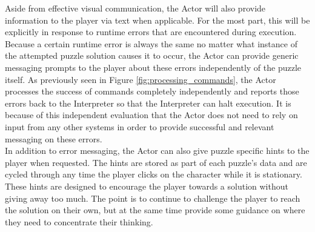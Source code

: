 Aside from effective visual communication, the Actor will also provide information to the player via text when applicable. For the most part, this will be explicitly in response to runtime errors that are encountered during execution. Because a certain runtime error is always the same no matter what instance of the attempted puzzle solution causes it to occur, the Actor can provide generic messaging prompts to the player about these errors independently of the puzzle itself. As previously seen in Figure \ref{fig:processing_commands}, the Actor processes the success of commands completely independently and reports those errors back to the Interpreter so that the Interpreter can halt execution. It is because of this independent evaluation that the Actor does not need to rely on input from any other systems in order to provide successful and relevant messaging on these errors.\\

In addition to error messaging, the Actor can also give puzzle specific hints to the player when requested. The hints are stored as part of each puzzle's data and are cycled through any time the player clicks on the character while it is stationary. These hints are designed to encourage the player towards a solution without giving away too much. The point is to continue to challenge the player to reach the solution on their own, but at the same time provide some guidance on where they need to concentrate their thinking.


\vfill
\clearpage